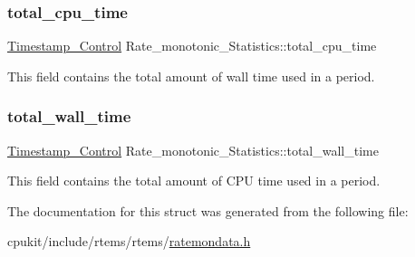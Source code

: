 \subsubsection{\texorpdfstring{total\_cpu\_time}{total\_cpu\_time}}
{\footnotesize\ttfamily \mbox{\hyperlink{group__SuperCoreTimeStamp_ga8508036506d5211c98844c88045e2410}{Timestamp\+\_\+\+Control}} Rate\+\_\+monotonic\+\_\+\+Statistics\+::total\+\_\+cpu\+\_\+time}

This field contains the total amount of wall time used in a period. \mbox{\label{structRate__monotonic__Statistics_af0238631b7deae9488d8dc0f4959a9eb}} 
\subsubsection{\texorpdfstring{total\_wall\_time}{total\_wall\_time}}
{\footnotesize\ttfamily \mbox{\hyperlink{group__SuperCoreTimeStamp_ga8508036506d5211c98844c88045e2410}{Timestamp\+\_\+\+Control}} Rate\+\_\+monotonic\+\_\+\+Statistics\+::total\+\_\+wall\+\_\+time}

This field contains the total amount of C\+PU time used in a period. 

The documentation for this struct was generated from the following file\+:\begin{DoxyCompactItemize}
\item 
cpukit/include/rtems/rtems/\mbox{\hyperlink{ratemondata_8h}{ratemondata.\+h}}\end{DoxyCompactItemize}
